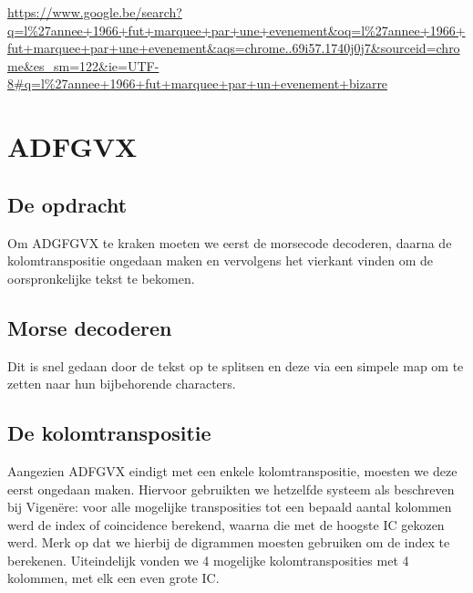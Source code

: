 
\urldef{\googleSearch}\url{https://www.google.be/search?q=l%27annee+1966+fut+marquee+par+une+evenement&oq=l%27annee+1966+fut+marquee+par+une+evenement&aqs=chrome..69i57.1740j0j7&sourceid=chrome&es_sm=122&ie=UTF-8#q=l%27annee+1966+fut+marquee+par+un+evenement+bizarre} %

\section{ADFGVX}
\subsection{De opdracht}
Om ADGFGVX te kraken moeten we eerst de morsecode decoderen, daarna de kolomtranspositie ongedaan maken en vervolgens het vierkant vinden om de oorspronkelijke tekst te bekomen.

\subsection{Morse decoderen}
Dit is snel gedaan door de tekst op te splitsen en deze via een simpele map om te zetten naar hun bijbehorende characters.

\subsection{De kolomtranspositie}
Aangezien ADFGVX eindigt met een enkele kolomtranspositie, moesten we deze eerst ongedaan maken. Hiervoor gebruikten we hetzelfde systeem als beschreven bij Vigen\"ere: voor alle mogelijke transposities tot een bepaald aantal kolommen werd de index of coincidence berekend, waarna die met de hoogste IC gekozen werd. Merk op dat we hierbij de digrammen moesten gebruiken om de index te berekenen. Uiteindelijk vonden we 4 mogelijke kolomtransposities met 4 kolommen, met elk een even grote IC.

